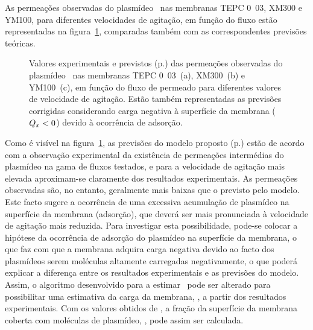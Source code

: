 As permeações observadas do plasmídeo \pVAX\ nas membranas TEPC \unit{0.03}{\micro\meter}, XM300 e YM100, para diferentes velocidades de agitação, em função do fluxo estão representadas na figura~\ref{fig:5art2}, comparadas também com as correspondentes previsões teóricas.
%
%
%
\begin{figure}[!t]
	\centering
	\setlength\figureheight{5cm} 
	\setlength\figurewidth{5cm}
	
	\caption[Permeações observadas do plasmídeo \pVAX\ nas membranas testadas]{Valores experimentais e previstos (p.) das permeações observadas do plasmídeo \pVAX\ nas membranas TEPC \unit{0.03}{\nano\meter}~(a), XM300~(b) e YM100~(c), em função do fluxo de permeado para diferentes valores de velocidade de agitação. Estão também representadas as previsões corrigidas considerando carga negativa à superfície da membrana ($Q_{x}<0$) devido à ocorrência de adsorção.}
	\label{fig:5art2}
\end{figure}
Como é visível na figura~\ref{fig:5art2}, as previsões do modelo proposto (p.) estão de acordo com a observação experimental da existência de permeações intermédias do plasmídeo na gama de fluxos testados, e para a velocidade de agitação mais elevada aproximam-se claramente dos resultados experimentais. As permeações observadas são, no entanto, geralmente mais baixas que o previsto pelo modelo. Este facto sugere a ocorrência de uma excessiva acumulação de plasmídeo na superfície da membrana (adsorção), que deverá ser mais pronunciada à velocidade de agitação mais reduzida.
% 
Para investigar esta possibilidade, pode-se colocar a hipótese da ocorrência de adsorção do plasmídeo na superfície da membrana, o que faz com que a membrana adquira carga negativa devido ao facto dos plasmídeos serem moléculas altamente carregadas negativamente, o que poderá explicar a diferença entre os resultados experimentais e as previsões do modelo. Assim, o algoritmo desenvolvido para a estimar \permobs\ pode ser alterado para possibilitar uma estimativa da carga da membrana, \cargamembrana, a partir dos resultados experimentais.
%
Com os valores obtidos de \cargamembrana, a fração da superfície da membrana coberta com moléculas de plasmídeo, \fracaomembrana, pode assim ser calculada. 

